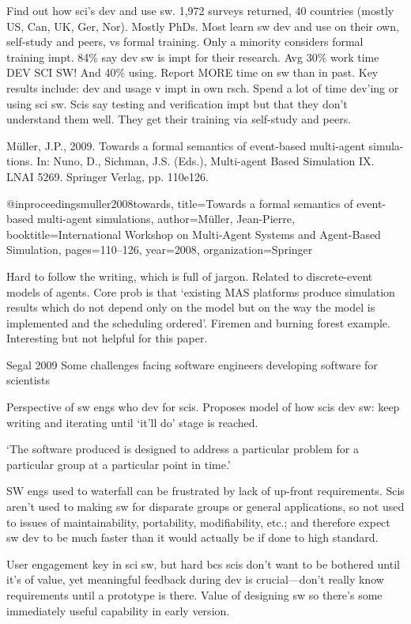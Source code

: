 \documentclass[12pt]{amsart}
\begin{document}
Find out how sci's dev and use sw. 1,972 surveys returned, 40 countries (mostly US, Can, UK, Ger, Nor). Mostly PhDs. Most learn sw dev and use on their own, self-study and peers, vs formal training. Only a minority considers formal training impt. 84\% say dev sw is impt for their research. Avg 30\% work time DEV SCI SW! And 40\% using. Report MORE time on sw than in past. Key results include: dev and usage v impt in own rsch. Spend a lot of time dev'ing or using sci sw. Scis say testing and verification impt but that they don't understand them well. They get their training via self-study and peers. 



M\"uller, J.P., 2009. Towards a formal semantics of event-based multi-agent simula- tions. In: Nuno, D., Sichman, J.S. (Eds.), Multi-agent Based Simulation IX. LNAI
5269. Springer Verlag, pp. 110e126.

@inproceedings{muller2008towards,
  title={Towards a formal semantics of event-based multi-agent simulations},
  author={M{\"u}ller, Jean-Pierre},
  booktitle={International Workshop on Multi-Agent Systems and Agent-Based Simulation},
  pages={110--126},
  year={2008},
  organization={Springer}
}

Hard to follow the writing, which is full of jargon. Related to discrete-event models of agents. Core prob is that `existing MAS platforms produce simulation results which do not depend only on the model but on the way the model is implemented and the scheduling ordered'. Firemen and burning forest example. Interesting but not helpful for this paper.





Segal 2009 Some challenges facing software engineers developing software for scientists

Perspective of sw engs who dev for scis. Proposes model of how scis dev sw: keep writing and iterating until `it'll do' stage is reached. 

`The software produced is designed to address a particular problem for a particular group at a particular point in time.'

SW engs used to waterfall can be frustrated by lack of up-front requirements. Scis aren't used to making sw for disparate groups or general applications, so not used to issues of maintainability, portability, modifiability, etc.; and therefore expect sw dev to be much faster than it would actually be if done to high standard.

User engagement key in sci sw, but hard bcs scis don't want to be bothered until it's of value, yet meaningful feedback during dev is crucial---don't really know requirements until a prototype is there. Value of designing sw so there's some immediately useful capability in early version.
\end{document}
